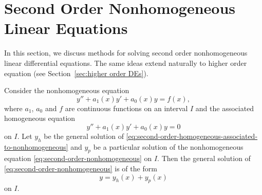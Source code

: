\section{Second Order Nonhomogeneous Linear  Equations}

In this section, we discuss  methods for solving second order nonhomogeneous linear differential equations.
The same ideas extend naturally to higher order equation (see Section~\ref{sec:higher order DEs}). 

\begin{theorem}\label{thm:second-order-nonhomogeneous-general-solution}
	Consider the nonhomogeneous  equation 
	\begin{equation}\label{eq:second-order-nonhomogeneous}
		y'' + a_1(x)y' + a_0(x)y = f(x),
	\end{equation}
	where \( a_1 \), \( a_0 \) and \(f\) are continuous functions on an interval $I$  and the associated homogeneous equation  
	\begin{equation}\label{eq:second-order-homogeneous-associated-to-nonhomogeneous}
		y'' + a_1(x)y' + a_0(x)y = 0
	\end{equation}
	on $I$. Let $y_h$ be the general solution of \eqref{eq:second-order-homogeneous-associated-to-nonhomogeneous} and
	$y_p$ be a particular solution of the nonhomogeneous equation \eqref{eq:second-order-nonhomogeneous} on $I.$ Then the general solution of \eqref{eq:second-order-nonhomogeneous} is of the form
	\begin{equation}\label{eq:second-order-nonhomogeneous-general-solution}
		\boxed{y = y_h(x) +y_p(x)}
	\end{equation} on $I.$ 
\end{theorem}
